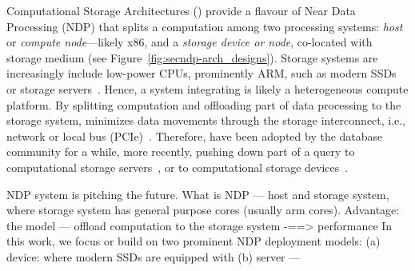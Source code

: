 

Computational Storage Architectures (\csd) provide a flavour of Near Data Processing (NDP) that 
splits a computation among two processing systems: \textit{host} or \textit{compute node}---likely x86, %
and a \textit{storage device or node}, co-located with storage medium (see Figure~\ref{fig:secndp-arch_designs}).
Storage systems are increasingly include low-power CPUs, prominently ARM, such as modern SSDs~\cite{Gu:2016:BFN:3001136.3001154,NGD} or storage servers~\cite{huaweiStorage,softiron,leapio}.
Hence, a system integrating \csd is likely a heterogeneous compute platform.
By splitting computation and offloading part of data processing to the storage system, %
\csd minimizes data movements through the storage interconnect, i.e., network or local bus (PCIe)~\cite{jaeScale,blockNDP}. Therefore, \csd have been adopted by the database community for a while, more recently, pushing down part of a query to computational storage servers~\cite{oracle,amazonS3select}, or to computational storage devices~\cite{gu2016,10.14778/2994509.2994512}. 


NDP system is pitching the future.
What is NDP — host and storage system, where storage system has general purpose cores (usually arm cores).
Advantage: the model — offload computation to the storage system -==> performance
In this work, we focus or build on two prominent NDP deployment models: (a) device: where modern SSDs are equipped with  (b) server ---
\fi

